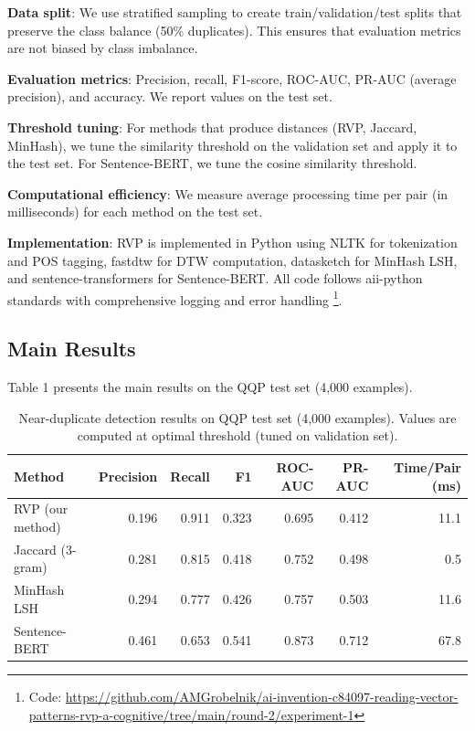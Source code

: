 \documentclass[11pt,letterpaper]{article}
\begin{document}
\textbf{Data split}: We use stratified sampling to create train/validation/test splits that preserve the class balance (50\% duplicates). This ensures that evaluation metrics are not biased by class imbalance.

\textbf{Evaluation metrics}: Precision, recall, F1-score, ROC-AUC, PR-AUC (average precision), and accuracy. We report values on the test set.

\textbf{Threshold tuning}: For methods that produce distances (RVP, Jaccard, MinHash), we tune the similarity threshold on the validation set and apply it to the test set. For Sentence-BERT, we tune the cosine similarity threshold.

\textbf{Computational efficiency}: We measure average processing time per pair (in milliseconds) for each method on the test set.

\textbf{Implementation}: RVP is implemented in Python using NLTK for tokenization and POS tagging, fastdtw for DTW computation, datasketch for MinHash LSH, and sentence-transformers for Sentence-BERT. All code follows aii-python standards with comprehensive logging and error handling \footnote{Code: \url{https://github.com/AMGrobelnik/ai-invention-c84097-reading-vector-patterns-rvp-a-cognitive/tree/main/round-2/experiment-1}}.

\subsection{Main Results}

Table 1 presents the main results on the QQP test set (4,000 examples).

\begin{table}[!htbp]
\centering
\caption{Near-duplicate detection results on QQP test set (4,000 examples). Values are computed at optimal threshold (tuned on validation set).}
\label{tab:main_results}
\begin{tabular}{lrrrrrr}
\toprule
Method & Precision & Recall & F1 & ROC-AUC & PR-AUC & Time/Pair (ms) \\
\midrule
RVP (our method) & 0.196 & 0.911 & 0.323 & 0.695 & 0.412 & 11.1 \\
Jaccard (3-gram) & 0.281 & 0.815 & 0.418 & 0.752 & 0.498 & 0.5 \\
MinHash LSH & 0.294 & 0.777 & 0.426 & 0.757 & 0.503 & 11.6 \\
Sentence-BERT & 0.461 & 0.653 & 0.541 & 0.873 & 0.712 & 67.8 \\
\bottomrule
\end{tabular}
\end{table}
\end{document}
